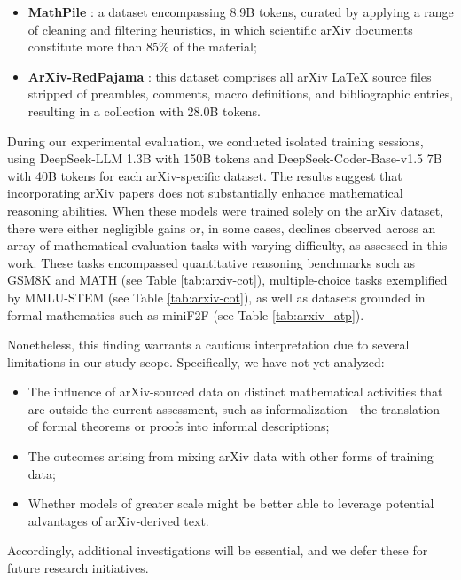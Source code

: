\begin{itemize}[topsep=0pt]
\begin{itemize}[topsep=0pt]
\begin{itemize}[topsep=0pt]
    \item \textbf{MathPile} \citep{mathpile}: a dataset encompassing 8.9B tokens, curated by applying a range of cleaning and filtering heuristics, in which scientific arXiv documents constitute more than 85\% of the material;
    \item \textbf{ArXiv-RedPajama} \citep{redpajama}: this dataset comprises all arXiv LaTeX source files stripped of preambles, comments, macro definitions, and bibliographic entries, resulting in a collection with 28.0B tokens.
\end{itemize}

During our experimental evaluation, we conducted isolated training sessions, using DeepSeek-LLM 1.3B with 150B tokens and DeepSeek-Coder-Base-v1.5 7B with 40B tokens for each arXiv-specific dataset. The results suggest that incorporating arXiv papers does not substantially enhance mathematical reasoning abilities. When these models were trained solely on the arXiv dataset, there were either negligible gains or, in some cases, declines observed across an array of mathematical evaluation tasks with varying difficulty, as assessed in this work. These tasks encompassed quantitative reasoning benchmarks such as GSM8K and MATH (see Table \ref{tab:arxiv-cot}), multiple-choice tasks exemplified by MMLU-STEM (see Table \ref{tab:arxiv-cot}), as well as datasets grounded in formal mathematics such as miniF2F (see Table \ref{tab:arxiv_atp}).

Nonetheless, this finding warrants a cautious interpretation due to several limitations in our study scope. Specifically, we have not yet analyzed:

\begin{itemize}[topsep=0pt]
    \item The influence of arXiv-sourced data on distinct mathematical activities that are outside the current assessment, such as informalization—the translation of formal theorems or proofs into informal descriptions;
    \item The outcomes arising from mixing arXiv data with other forms of training data;
    \item Whether models of greater scale might be better able to leverage potential advantages of arXiv-derived text.
\end{itemize}

Accordingly, additional investigations will be essential, and we defer these for future research initiatives.


\end{itemize}
\end{itemize}
